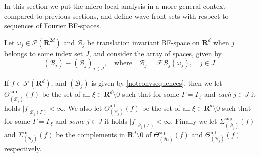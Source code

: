 \documentclass[12pt,a4paper,reqno]{amsart}
\numberwithin{equation}{section}
\numberwithin{thm}{section}
\theoremstyle{definition}
\theoremstyle{remark}
\begin{document}
\par

In this section we put the micro-local analysis in a more general
context compared to previous sections,
and define wave-front sets with respect to sequences of
Fourier BF-spaces.

\par

Let $\omega _j \in \mathscr
P({\mathbf R^{{2d}}})$ and $\mathscr B_j$ be translation invariant BF-space on
${\mathbf R^{d}}$ when $j$ belongs to some index set $J$, and consider the array
of spaces, given by
\begin{equation}\label{notconvsequences}
(\mathcal B_j) \equiv (\mathcal B_j)_{j\in J},\quad
\text{where}\quad \mathcal B_j={\mathscr F\! \mathscr B} _j {(\omega
_j)}, \quad j \in J.
\end{equation}

\par

If $f\in \mathscr S'({\mathbf R^{d}})$, and $(\mathcal B_j)$ is given by
\eqref{notconvsequences}, then we let
$\Theta_{(\mathcal B_j) }^{\sup}(f)$ be the set of all $\xi \in {\mathbf R^{d}}{\setminus 0}$ such that for some $\Gamma = \Gamma _{\xi}$ and \emph{each}
$j\in J$ it holds $|f|_{\mathcal B_j(\Gamma )} < \infty$. We
also let $\Theta _{(\mathcal B_j) }^{\inf}(f)$ be the set of all $
\xi \in {\mathbf R^{d}}{\setminus 0} $ such that for some $\Gamma = \Gamma
_{\xi}$ and \emph{some} $j\in J$ it holds $|f|_{\mathcal B_j(\Gamma)}
<\infty$. Finally we let $\Sigma _{(\mathcal B_j) }^{\sup} (f)$ and
$\Sigma _{(\mathcal B_j) }^{\inf} (f)$ be the complements in ${\mathbf R^{d}}{\setminus 0} $ of $\Theta_{(\mathcal B_j) }^{\sup}(f)$ and $\Theta
_{(\mathcal B_j) }^{\inf} (f)$ respectively.

\par
\end{document}
